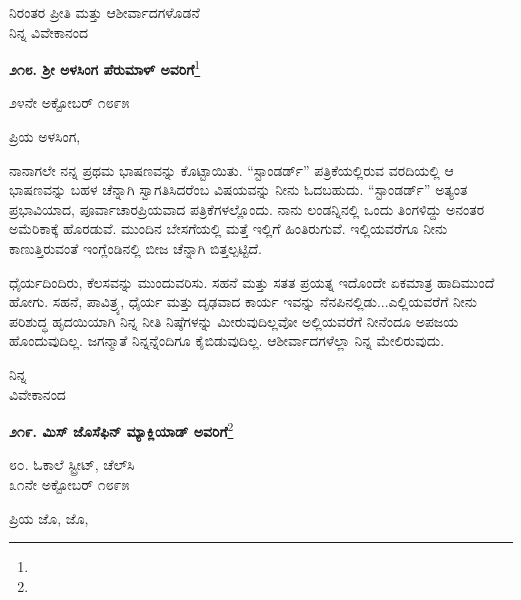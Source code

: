 \vspace{-0.3cm}

{\flushright
ನಿರಂತರ ಪ್ರೀತಿ ಮತ್ತು ಆಶೀರ್ವಾದಗಳೊಡನೆ\\ನಿನ್ನ ವಿವೇಕಾನಂದ\par}

\begin{center}
\textbf{೨೧೮. ಶ‍್ರೀ ಅಳಸಿಂಗ ಪೆರುಮಾಳ್ ಅವರಿಗೆ}\footnote{}
\end{center}

\vspace{-0.5cm}

\begin{flushright}
೨೪ನೇ ಅಕ್ಟೋಬರ್ ೧೮೯೫
\end{flushright}

\vspace{-0.3cm}

\noindent
ಪ್ರಿಯ ಅಳಸಿಂಗ,

ನಾನಾಗಲೇ ನನ್ನ ಪ್ರಥಮ ಭಾಷಣವನ್ನು ಕೊಟ್ಟಾಯಿತು. “ಸ್ಟಾಂಡರ್ಡ್” ಪತ್ರಿಕೆಯಲ್ಲಿರುವ ವರದಿಯಲ್ಲಿ ಆ ಭಾಷಣವನ್ನು ಬಹಳ ಚೆನ್ನಾಗಿ ಸ್ವಾಗತಿಸಿದರೆಂಬ ವಿಷಯವನ್ನು ನೀನು ಓದಬಹುದು. “ಸ್ಟಾಂಡರ್ಡ್” ಅತ್ಯಂತ ಪ್ರಭಾವಿಯಾದ, ಪೂರ್ವಾಚಾರಪ್ರಿಯವಾದ ಪತ್ರಿಕೆಗಳಲ್ಲೊಂದು. ನಾನು ಲಂಡನ್ನಿನಲ್ಲಿ ಒಂದು ತಿಂಗಳಿದ್ದು ಅನಂತರ ಅಮೆರಿಕಾಕ್ಕೆ ಹೊರಡುವೆ. ಮುಂದಿನ ಬೇಸಗೆಯಲ್ಲಿ ಮತ್ತೆ ಇಲ್ಲಿಗೆ ಹಿಂತಿರುಗುವೆ. ಇಲ್ಲಿಯವರೆಗೂ ನೀನು ಕಾಣುತ್ತಿರುವಂತೆ ಇಂಗ್ಲೆಂಡಿನಲ್ಲಿ ಬೀಜ ಚೆನ್ನಾಗಿ ಬಿತ್ತಲ್ಪಟ್ಟಿದೆ.

ಧೈರ್ಯದಿಂದಿರು, ಕೆಲಸವನ್ನು ಮುಂದುವರಿಸು. ಸಹನೆ ಮತ್ತು ಸತತ ಪ್ರಯತ್ನ ಇದೊಂದೇ ಏಕಮಾತ್ರ ಹಾದಿ\enginline{-}ಮುಂದೆ ಹೋಗು. ಸಹನೆ, ಪಾವಿತ್ರ್ಯ, ಧೈರ್ಯ ಮತ್ತು ದೃಢವಾದ ಕಾರ್ಯ ಇವನ್ನು ನೆನಪಿನಲ್ಲಿಡು...ಎಲ್ಲಿಯವರೆಗೆ ನೀನು ಪರಿಶುದ್ಧ ಹೃದಯಿಯಾಗಿ ನಿನ್ನ ನೀತಿ ನಿಷ್ಠೆಗಳನ್ನು ಮೀರುವುದಿಲ್ಲವೋ ಅಲ್ಲಿಯವರೆಗೆ ನೀನೆಂದೂ ಅಪಜಯ ಹೊಂದುವುದಿಲ್ಲ. ಜಗನ್ಮಾತೆ ನಿನ್ನನ್ನೆಂದಿಗೂ ಕೈಬಿಡುವುದಿಲ್ಲ. ಆಶೀರ್ವಾದಗಳೆಲ್ಲಾ ನಿನ್ನ ಮೇಲಿರುವುದು.

{\flushright
ನಿನ್ನ\\ವಿವೇಕಾನಂದ\par}
\vspace{0.2cm}

\begin{center}
\textbf{೨೧೯. ಮಿಸ್‌ ಜೊಸೆಫಿನ್ ಮ್ಯಾಕ್ಲಿಯಾಡ್ ಅವರಿಗೆ}\footnote{}
\end{center}
\vspace{0.1cm}

\begin{flushright}
೮೦. ಓಕಾಲೆ ಸ್ಟ್ರೀಟ್, ಚೆಲ್‌ಸಿ\\೩೧ನೇ ಅಕ್ಟೋಬರ್ ೧೮೯೫
\end{flushright}

\noindent
ಪ್ರಿಯ ಜೊ, ಜೊ,

